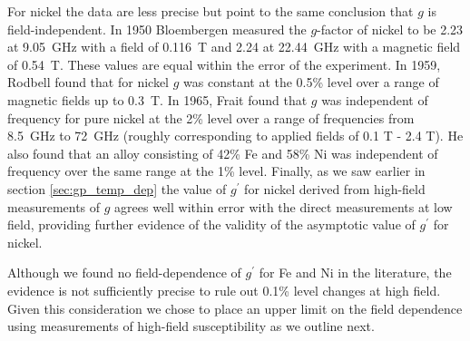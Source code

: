 \documentclass[preprint,12pt]{elsarticle}
\begin{document}
{For nickel the data are less precise but point to the same conclusion that $g$ is field-independent. In 1950 Bloembergen measured the $g$-factor of nickel to be 2.23 at 9.05~GHz with a field of 0.116~T and 2.24 at 22.44~GHz with a magnetic field of 0.54~T. These values are equal within the error of the experiment. In 1959, Rodbell found that for nickel $g$ was constant at the 0.5\% level over a range of magnetic fields up to 0.3~T\cite{Rodbell1959}. In 1965, Frait found that $g$ was independent of frequency for pure nickel at the 2\% level over a range of frequencies from 8.5~GHz to 72~GHz (roughly corresponding to applied fields of 0.1 T - 2.4 T). He also found that an alloy consisting of 42\% Fe and 58\% Ni was independent of frequency over the same range at the 1\% level\cite{Frait1965}. Finally, as we saw earlier in section \ref{sec:gp_temp_dep} the value of $g^{\prime}$ for nickel derived from high-field measurements of $g$ agrees well within error with the direct measurements at low field, providing further evidence of the validity of the asymptotic value of $g^{\prime}$ for nickel. 

Although we found no field-dependence of $g^\prime$ for Fe and Ni in the literature, the evidence is not sufficiently precise to rule out 0.1\% level changes at high field. Given this consideration we chose to place an upper limit on the field dependence using measurements of high-field susceptibility as we outline next.

}
\end{document}
